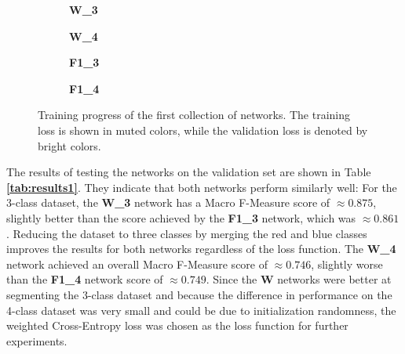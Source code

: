 \begin {figure}[!htb]
	\begin {subfigure}[b]{0.4\linewidth}
		\scalebox{0.65}{}
		\caption{\textbf{W\_3}}
	\end {subfigure}\hspace{1.75cm}
	\begin {subfigure}[b]{0.4\linewidth}
		\scalebox{0.65}{}
		\caption{\textbf{W\_4}}
	\end {subfigure}

	\begin {subfigure}[b]{0.4\linewidth}
		\scalebox{0.65}{}
		\caption{\textbf{F1\_3}}
	\end {subfigure}\hspace{1.75cm}
	\begin {subfigure}[b]{0.4\linewidth}
		\scalebox{0.65}{}
		\caption{\textbf{F1\_4}}
	\end {subfigure}

		\caption[Training progress of the first collection of networks.]{Training progress of the first collection of networks. The training loss is shown in muted colors, while the validation loss is denoted by bright colors.}
		\label{fig:weighted_f1_training}
\end {figure}

\noindent The results of testing the networks on the validation set are shown in Table \textbf{\ref{tab:results1}}. They indicate that both networks perform similarly well: For the 3-class dataset, the \textbf{W\_3} network has a Macro F-Measure score of $\approx0.875$, slightly better than the score achieved by the \textbf{F1\_3} network, which was $\approx0.861$. Reducing the dataset to three classes by merging the red and blue classes improves the results for both networks regardless of the loss function. The \textbf{W\_4} network achieved an overall Macro F-Measure score of $\approx0.746$, slightly worse than the \textbf{F1\_4} network score of $\approx0.749$. Since the \textbf{W} networks were better at segmenting the 3-class dataset and because the difference in performance on the 4-class dataset was very small and could be due to initialization randomness, the weighted Cross-Entropy loss was chosen as the loss function for further experiments.\\


